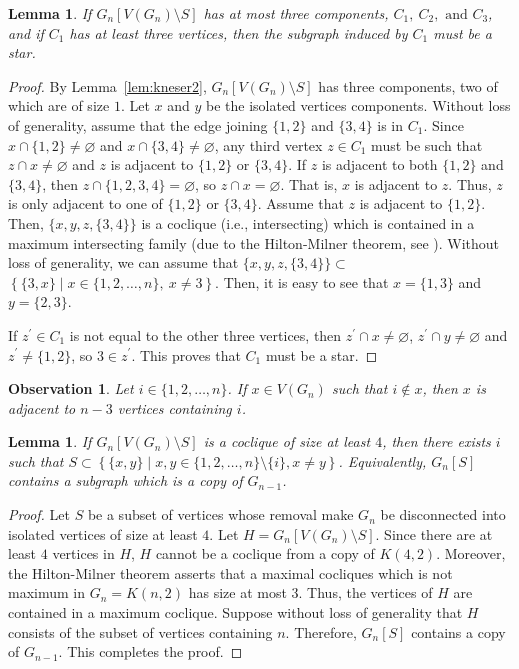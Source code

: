 \documentclass[3p,times,12pt]{article}
\newtheorem{lemma}[theorem]{Lemma}
\newtheorem{obs}[theorem]{Observation}
\begin{document}
	\begin{lemma}
		If $G_n[V(G_n) \setminus S]$ has at most three components, $C_1,\ C_2, \mbox{ and }C_3$, and if $C_1$ has at least three vertices, then the subgraph induced by $C_1$ must be a star.\label{lem:kneser4}
	\end{lemma}
	\begin{proof}
		By Lemma~\ref{lem:kneser2}, $G_n[V(G_n) \setminus S]$ has three components, two of which are of size $1$. Let $x$ and $y$ be the isolated vertices components. Without loss of generality, assume that the edge joining $\{1,2\}$ and $\{3,4\}$ is in $C_1$. Since $x\cap \{1,2\}\neq \varnothing$ and $x\cap \{3,4\} \neq \varnothing$, any third vertex $z \in C_1$ must be such that $z\cap x \neq \varnothing$ and $z$ is adjacent to $\{1,2\}$ or $\{3,4\}$. If $z$ is adjacent to both $\{1,2\}$ and $\{3,4\}$, then $z\cap \{1,2,3,4\} = \varnothing$, so $z\cap x = \varnothing$. That is, $x$ is adjacent to $z$. Thus, $z$ is only adjacent to one of $\{1,2\}$ or $\{3,4\}$. Assume that $z$ is adjacent to $\{1,2\}$. Then, $\{x,y,z,\{3,4\}\}$ is a coclique (i.e., intersecting) which is contained in a maximum intersecting family (due to the Hilton-Milner theorem, see \cite{GM, hilton1967some}). Without loss of generality, we can assume that $\{x,y,z,\{3,4\}\} \subset $ $\left\{ \{3,x\} \mid x\in \{1,2,\ldots,n\}, \ x\neq 3 \right\}$. Then, it is easy to see that $x = \{1,3\}$ and $y = \{2,3\}$.
		
		If $z^\prime \in C_1$ is not equal to the other three vertices, then $z^\prime \cap x\neq \varnothing$,  $z^\prime \cap y \neq \varnothing$ and $z^\prime \neq \{1,2\}$, so $3\in z^\prime$. This proves that $C_1$ must be a star.
	\end{proof}
	\begin{obs}
		Let $i\in \{1,2,\ldots,n\}$. If $x\in V(G_n)$ such that $i\not \in x$, then $x$ is adjacent to $n-3$ vertices containing $i$.\label{lem:kneser5}
	\end{obs}
	
	\begin{lemma}
		If $G_n[V(G_n) \setminus S]$ is a coclique of size at least $4$, then there exists $i$ such that $S \subset \left\{ \{x,y\} \mid x,y\in \{1,2,\ldots,n\}\setminus \{i\}, x\neq y \right\}$. Equivalently, $G_n[S] $ contains a subgraph which is a copy of $G_{n-1}$.\label{lem:kneser3}
	\end{lemma}
	\begin{proof}
		Let $S$ be a subset of vertices whose removal make $G_n$ be disconnected into isolated vertices of size at least $4$. Let $H = G_n[V(G_n) \setminus S]$. Since there are at least $4$ vertices in $H$, $H$ cannot be a coclique from a copy of $K(4,2)$. Moreover, the Hilton-Milner theorem \cite{GM, hilton1967some} asserts that a maximal cocliques which is not maximum in $G_n = K(n,2)$ has size at most $3$. Thus, the vertices of $H$ are contained in a maximum coclique. Suppose without loss of generality that $H$ consists of the subset of vertices containing $n$. Therefore, $G_n[S]$ contains a copy of $G_{n-1}$. This completes the proof.
	\end{proof}
	
\end{document}
